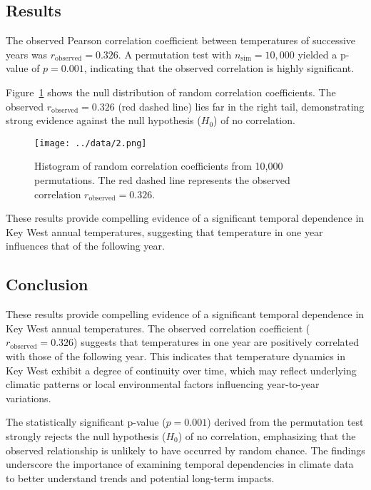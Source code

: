 \documentclass[a4paper,10pt]{article}
\begin{document}
\subsection*{Results}
The observed Pearson correlation coefficient between temperatures of successive years was \(r_{\text{observed}} = 0.326\). A permutation test with \(n_{\text{sim}} = 10,000\) yielded a p-value of \(p = 0.001\), indicating that the observed correlation is highly significant.

Figure~\ref{fig:histogram} shows the null distribution of random correlation coefficients. The observed \(r_{\text{observed}} = 0.326\) (red dashed line) lies far in the right tail, demonstrating strong evidence against the null hypothesis (\(H_0\)) of no correlation.


\begin{figure}[h!]
\centering
\texttt{[image: ../data/2.png]}
\caption{Histogram of random correlation coefficients from 10,000 permutations. The red dashed line represents the observed correlation \(r_{\text{observed}} = 0.326\).}
\label{fig:histogram}
\end{figure}

These results provide compelling evidence of a significant temporal dependence in Key West annual temperatures, suggesting that temperature in one year influences that of the following year.

\subsection*{\textbf{Conclusion}}
These results provide compelling evidence of a significant temporal dependence in Key West annual temperatures. The observed correlation coefficient (\(r_{\text{observed}} = 0.326\)) suggests that temperatures in one year are positively correlated with those of the following year. This indicates that temperature dynamics in Key West exhibit a degree of continuity over time, which may reflect underlying climatic patterns or local environmental factors influencing year-to-year variations.

The statistically significant p-value (\(p = 0.001\)) derived from the permutation test strongly rejects the null hypothesis (\(H_0\)) of no correlation, emphasizing that the observed relationship is unlikely to have occurred by random chance. The findings underscore the importance of examining temporal dependencies in climate data to better understand trends and potential long-term impacts.
\end{document}
